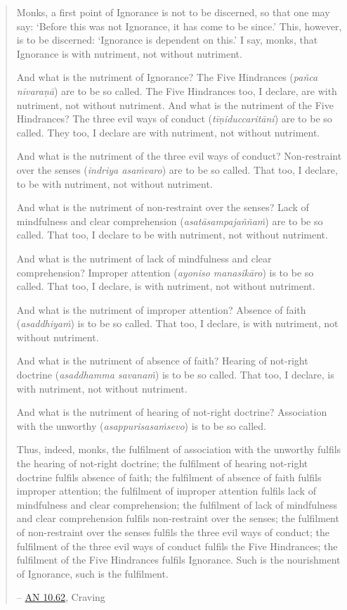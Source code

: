 \begin{quote}
Monks, a first point of Ignorance is not to be discerned, so that one may say: `Before this was not Ignorance, it has come to be since.' This, however, is to be discerned: `Ignorance is dependent on this.' I say, monks, that Ignorance is with nutriment, not without nutriment.

And what is the nutriment of Ignorance? The Five Hindrances (\textit{pañca nīvaraṇā}) are to be so called. The Five Hindrances too, I declare, are with nutriment, not without nutriment. And what is the nutriment of the Five Hindrances? The three evil ways of conduct (\textit{tīṇiduccaritāni}) are to be so called. They too, I declare are with nutriment, not without nutriment.

And what is the nutriment of the three evil ways of conduct? Non-restraint over the senses (\textit{indriya asaṁvaro}) are to be so called. That too, I declare, to be with nutriment, not without nutriment.

And what is the nutriment of non-restraint over the senses? Lack of mindfulness and clear comprehension (\textit{asatāsampajaññaṁ}) are to be so called. That too, I declare to be with nutriment, not without nutriment.

And what is the nutriment of lack of mindfulness and clear comprehension? Improper attention (\textit{ayoniso manasikāro}) is to be so called. That too, I declare, is with nutriment, not without nutriment.

And what is the nutriment of improper attention? Absence of faith (\textit{asaddhiyaṁ}) is to be so called. That too, I declare, is with nutriment, not without nutriment.

And what is the nutriment of absence of faith? Hearing of not-right doctrine (\textit{asaddhamma savanaṁ}) is to be so called. That too, I declare, is with nutriment, not without nutriment.

And what is the nutriment of hearing of not-right doctrine? Association with the unworthy (\textit{asappurisasaṁsevo}) is to be so called.

Thus, indeed, monks, the fulfilment of association with the unworthy fulfils the hearing of not-right doctrine; the fulfilment of hearing not-right doctrine fulfils absence of faith; the fulfilment of absence of faith fulfils improper attention; the fulfilment of improper attention fulfils lack of mindfulness and clear comprehension; the fulfilment of lack of mindfulness and clear comprehension fulfils non-restraint over the senses; the fulfilment of non-restraint over the senses fulfils the three evil ways of conduct; the fulfilment of the three evil ways of conduct fulfils the Five Hindrances; the fulfilment of the Five Hindrances fulfils Ignorance. Such is the nourishment of Ignorance, such is the fulfilment.

 -- \href{https://suttacentral.net/an10.62/en/bodhi}{AN 10.62}, Craving
\end{quote}

